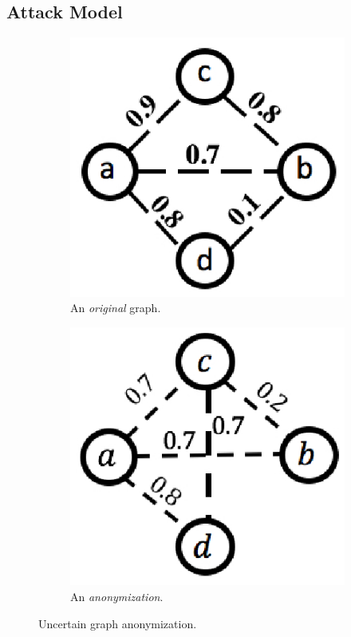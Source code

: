 \subsection{Attack Model}
\begin{figure}[t!]
    \centering
    \begin{subfigure}[t]{0.4\textwidth}
        \centering
        \includegraphics[scale=0.6]{figures/DegreeAUG/trueGraph.eps}
        \caption{\small{An \emph{original} graph.}}
         \label{fig:trueGraph}
    \end{subfigure}
    \begin{subfigure}[t]{0.4\textwidth}
        \centering
        \includegraphics[scale=0.6]{figures/DegreeAUG/anGraph.eps}
        \caption{\small{An \emph{anonymization}.}}
        \label{fig:anGraph}
    \end{subfigure}
    \caption{Uncertain graph anonymization.}
    \label{fig:augExample}
\end{figure}
